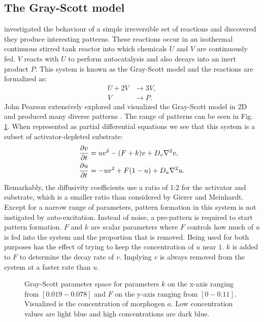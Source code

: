 \subsection{The Gray-Scott model}
\citet{Gray1984} investigated the behaviour of a simple irreversible set of reactions and discovered they produce interesting patterns. These reactions occur in an isothermal continuous stirred tank reactor into which chemicals $U$ and $V$ are continuously fed. $V$ reacts with $U$ to perform autocatalysis and also decays into an inert product $P$. This system is known as the Gray-Scott model and the reactions are formalized as:
	\begin{equation}
	\begin{aligned}
	U + 2V &\to 3V, \\
	V &\to P.
	\end{aligned}
	\end{equation}
John Pearson extensively explored and visualized the Gray-Scott model in 2D and produced many diverse patterns \citep{pearson1993}. The range of patterns can be seen in Fig. \ref{fig:grayscottParameterMap}. When represented as partial differential equations we see that this system is a subset of activator-depleted substrate:
	\begin{equation}
	\begin{aligned} \label{eq:grayscottRD}
	\frac{\partial v}{\partial t} &= uv^2 - (F+k)v + D_v \nabla^2 v,\\
	\frac{\partial u}{\partial t} &= -uv^2 + F(1-u) + D_u \nabla^2 u.
	\end{aligned}
	\end{equation}
Remarkably, the diffusivity coefficients use a ratio of 1:2 for the activator and substrate, which is a smaller ratio than considered by Gierer and Meinhardt. Except for a narrow range of parameters, pattern formation in this system is not instigated by auto-excitation. Instead of noise, a pre-pattern is required to start pattern formation. $F$ and $k$ are scalar parameters where $F$ controls how much of $u$ is fed into the system and the proportion that is removed. Being used for both purposes has the effect of trying to keep the concentration of $u$ near $1$. $k$ is added to $F$ to determine the decay rate of $v$. Implying $v$ is always removed from the system at a faster rate than $u$.

\begin{figure}[H]
	\centering
	\caption{Gray-Scott parameter space for parameters $k$ on the x-axis ranging from $[0.019 - 0.078]$ and $F$ on the y-axis ranging from $[0 - 0.11]$. Visualized is the concentration of morphogen $a$. Low concentration values are light blue and high concentrations are dark blue.}
	\label{fig:grayscottParameterMap}
\end{figure}

